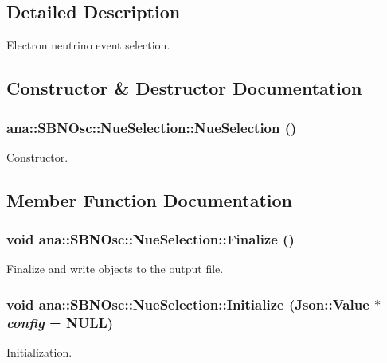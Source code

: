\subsection{Detailed Description}
Electron neutrino event selection. 

\subsection{Constructor \& Destructor Documentation}
\hypertarget{classana_1_1SBNOsc_1_1NueSelection_aa7520d861b94192521dd188b6ef4a7a5}{
\subsubsection[{NueSelection}]{\setlength{\rightskip}{0pt plus 5cm}ana::SBNOsc::NueSelection::NueSelection ()}}
\label{classana_1_1SBNOsc_1_1NueSelection_aa7520d861b94192521dd188b6ef4a7a5}
Constructor. 

\subsection{Member Function Documentation}
\hypertarget{classana_1_1SBNOsc_1_1NueSelection_a27bfa9d84344b8615e26f03f49a0a618}{
\subsubsection[{Finalize}]{\setlength{\rightskip}{0pt plus 5cm}void ana::SBNOsc::NueSelection::Finalize ()}}
\label{classana_1_1SBNOsc_1_1NueSelection_a27bfa9d84344b8615e26f03f49a0a618}
Finalize and write objects to the output file. \hypertarget{classana_1_1SBNOsc_1_1NueSelection_a65827f6f5670431cad9479d6e9c3a3dc}{
\subsubsection[{Initialize}]{\setlength{\rightskip}{0pt plus 5cm}void ana::SBNOsc::NueSelection::Initialize (Json::Value $\ast$ {\em config} = {\ttfamily NULL})}}
\label{classana_1_1SBNOsc_1_1NueSelection_a65827f6f5670431cad9479d6e9c3a3dc}
Initialization.


